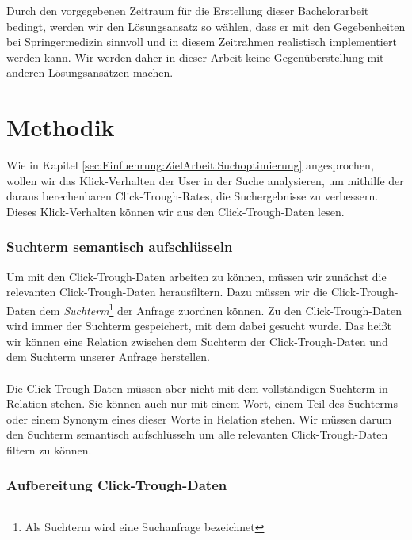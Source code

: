 Durch den vorgegebenen Zeitraum für die Erstellung dieser Bachelorarbeit bedingt, werden wir den Lösungsansatz so wählen, dass er mit den Gegebenheiten bei Springermedizin sinnvoll und in diesem Zeitrahmen realistisch implementiert werden kann. Wir werden daher in dieser Arbeit keine Gegenüberstellung mit anderen Lösungsansätzen machen. 


\section{Methodik}
\label{sec:Einfuehrung:Methodik}

Wie in Kapitel \ref{sec:Einfuehrung:ZielArbeit:Suchoptimierung} angesprochen, wollen wir das Klick-Verhalten der User in der Suche analysieren, um mithilfe der daraus berechenbaren Click-Trough-Rates, die Suchergebnisse zu verbessern. Dieses Klick-Verhalten können wir aus den Click-Trough-Daten lesen. 

\subsubsection{Suchterm semantisch aufschlüsseln}
\label{sec:Einfuehrung:Methodik:SuchtermSegmentierung}

Um mit den Click-Trough-Daten arbeiten zu können, müssen wir zunächst die relevanten Click-Trough-Daten herausfiltern. Dazu müssen wir die Click-Trough-Daten dem \textit{Suchterm}\footnote{Als Suchterm wird eine Suchanfrage bezeichnet} der Anfrage zuordnen können. Zu den Click-Trough-Daten wird immer der Suchterm gespeichert, mit dem dabei gesucht wurde. Das heißt wir können eine Relation zwischen dem Suchterm der Click-Trough-Daten und dem Suchterm unserer Anfrage herstellen.
\\
\\
Die Click-Trough-Daten müssen aber nicht mit dem vollständigen Suchterm in Relation stehen. Sie können auch nur mit einem Wort, einem Teil des Suchterms oder einem Synonym eines dieser Worte in Relation stehen. Wir müssen darum den Suchterm semantisch aufschlüsseln um alle relevanten Click-Trough-Daten filtern zu können. 

\subsubsection{Aufbereitung Click-Trough-Daten}
\label{sec:Einfuehrung:Methodik:Click-Trough-Daten}

